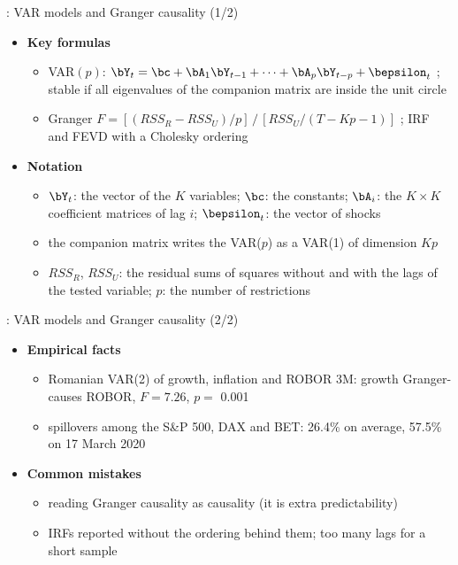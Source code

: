 \begin{frame}{: VAR models and Granger causality (1/2)}
\itemsize{\footnotesize}
\begin{itemize}
    \item \textbf{Key formulas}
    \begin{itemize}
        \item VAR$(p)$: $\bY_t = \bc + \bA_1\bY_{t-1} + \dots + \bA_p\bY_{t-p} + \bepsilon_t$ ; stable if all eigenvalues of the companion matrix are inside the unit circle
        \item Granger $F = [(RSS_R - RSS_U)/p]\,/\,[RSS_U/(T - Kp - 1)]$ ; IRF and FEVD with a Cholesky ordering
    \end{itemize}
    \item \textbf{Notation}
    \begin{itemize}
        \item $\bY_t$: the vector of the $K$ variables; $\bc$: the constants; $\bA_i$: the $K \times K$ coefficient matrices of lag $i$; $\bepsilon_t$: the vector of shocks
        \item the companion matrix writes the VAR($p$) as a VAR(1) of dimension $Kp$
        \item $RSS_R$, $RSS_U$: the residual sums of squares without and with the lags of the tested variable; $p$: the number of restrictions
    \end{itemize}
\end{itemize}
\end{frame}

\begin{frame}{: VAR models and Granger causality (2/2)}
\itemsize{\footnotesize}
\begin{itemize}
    \item \textbf{Empirical facts}
    \begin{itemize}
        \item Romanian VAR(2) of growth, inflation and ROBOR 3M: growth Granger-causes ROBOR, $F = 7.26$, $p =$ 0.001
        \item spillovers among the S\&P 500, DAX and BET: 26.4\% on average, 57.5\% on 17 March 2020
    \end{itemize}
    \item \textbf{Common mistakes}
    \begin{itemize}
        \item reading Granger causality as causality (it is extra predictability)
        \item IRFs reported without the ordering behind them; too many lags for a short sample
    \end{itemize}
\end{itemize}
\end{frame}


